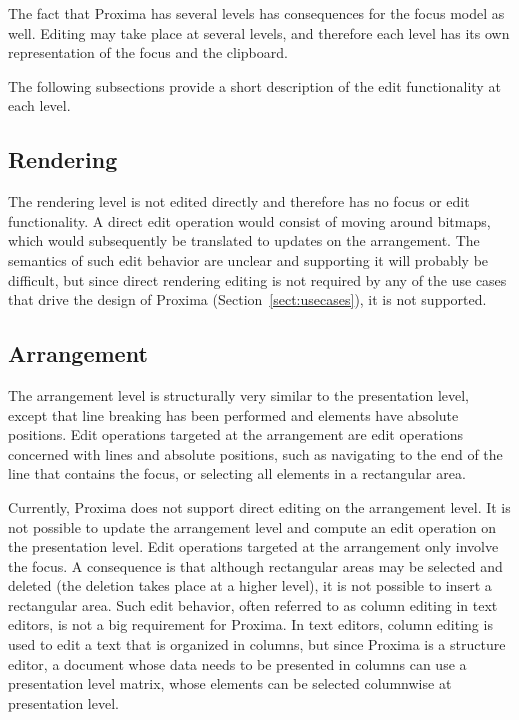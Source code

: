 The fact that Proxima has several levels has consequences for the focus model as well.  Editing may take place at several levels, and therefore each level has its own representation of the focus and the clipboard. 

The following subsections provide a short description of the edit functionality at each level. 


\subsection{Rendering}

The rendering level is not edited directly and therefore has no focus or edit functionality. A direct edit operation would consist of moving around bitmaps, which would subsequently be translated to updates on the arrangement. The semantics of such edit behavior are unclear and supporting it will probably be difficult, but since direct rendering editing is not required by any of the use cases that drive the design of Proxima (Section~\ref{sect:usecases}), it is not supported.

\subsection{Arrangement}

The arrangement level is structurally very similar to the presentation level, except that line breaking has been performed and elements have absolute positions. Edit operations targeted at the arrangement are edit operations concerned with lines and absolute positions, such as navigating to the end of the line that contains the focus, or selecting all elements in a rectangular area.

Currently, Proxima does not support direct editing on the arrangement level. It is not possible to update the arrangement level and compute an edit operation on the presentation level. Edit operations targeted at the arrangement only involve the focus. A consequence is that although rectangular areas may be selected and deleted (the deletion takes place at a higher level), it is not possible to insert a rectangular area. Such edit behavior, often referred to as column editing in text editors, is not a big requirement for Proxima. In text editors, column editing is used to edit a text that is organized in columns, but since Proxima is a structure editor, a document whose data needs to be presented in columns can use a presentation level matrix, whose elements can be selected columnwise at presentation level.

